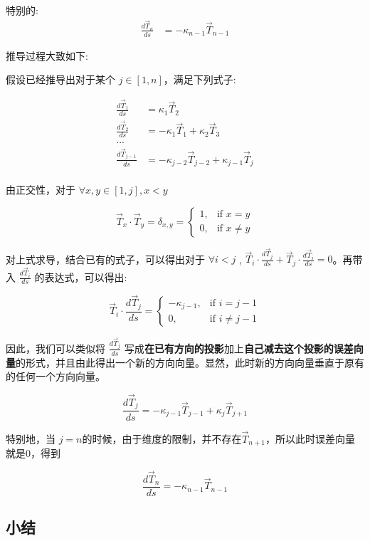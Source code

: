 \documentclass[fontset=windows]{article}
\begin{document}
特别的:
$$
\begin{aligned}
    \frac{d\vec{T}_{n}}{ds} &= -\kappa_{n-1} \vec{T}_{n-1}
\end{aligned}
$$

推导过程大致如下:

假设已经推导出对于某个 $j \in [1,n]$，满足下列式子:

$$
\begin{aligned}    
    \frac{d\vec{T}_1}{ds}   &= \kappa_1 \vec{T}_2 \\
    \frac{d\vec{T}_2}{ds}   &= -\kappa_1 \vec{T}_1  + \kappa_2 \vec{T}_3 \\
    ...\\
    \frac{d\vec{T}_{j-1}}{ds} &= -\kappa_{j-2} \vec{T}_{j-2}  + \kappa_{j-1} \vec{T}_{j} \\
\end{aligned}
$$


由正交性，对于 $\forall x,y \in [1,j], x < y$

$$
\vec{T}_x \cdot \vec{T}_y = \delta_{x,y} =
\begin{cases}
    1   ,&\text{if $x = y$}       \\
    0   ,&\text{if $x \ne y$}
\end{cases}
$$

对上式求导，结合已有的式子，可以得出对于 $\forall i < j$ , $\vec{T}_i \cdot \frac{d\vec{T}_j}{ds} +\vec{T}_j \cdot \frac{d\vec{T}_i}{ds} = 0 $。再带入 $\frac{d\vec{T}_i}{ds}$ 的表达式，可以得出:

$$
\vec{T}_i \cdot \frac{d\vec{T}_j}{ds} = 
\begin{cases}
    -\kappa_{j-1},&\text{if $i = j-1$}       \\
    0   ,&\text{if $i \ne j-1$}
\end{cases}
$$ 

因此，我们可以类似将 $\frac{d\vec{T}_j}{ds}$ 写成\textbf{在已有方向的投影}加上\textbf{自己减去这个投影的误差向量}的形式，并且由此得出一个新的方向向量。显然，此时新的方向向量垂直于原有的任何一个方向向量。

$$
\frac{d\vec{T}_{j}}{ds} = -\kappa_{j-1} \vec{T}_{j-1}  + \kappa_{j} \vec{T}_{j+1}
$$

特别地，当 $j = n$的时候，由于维度的限制，并不存在$\vec{T}_{n+1}$，所以此时误差向量就是0，得到

$$
\frac{d\vec{T}_{n}}{ds} = -\kappa_{n-1} \vec{T}_{n-1}
$$

\subsection{小结}
\end{document}
